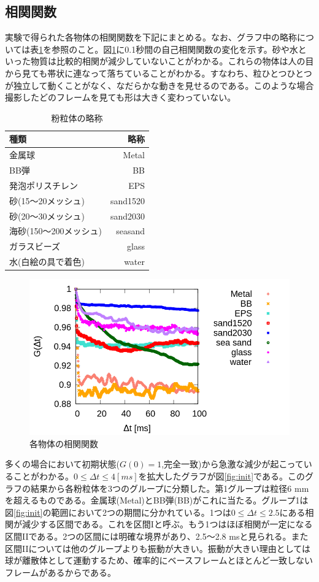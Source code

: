\documentclass[a4paper,10pt,twocolumn,dvipdfmx]{jsarticle}
\newcommand{\Dt}{\Delta t}
\newcommand{\II}{I\hspace{-.1em}I}
\begin{document}
\subsection{相関関数}
実験で得られた各物体の相関関数を下記にまとめる。なお、グラフ中の略称については表\ref{tb:ballname}を参照のこと。図\ref{fig:overall}に0.1秒間の自己相関関数の変化を示す。砂や水といった物質は比較的相関が減少していないことがわかる。これらの物体は人の目から見ても帯状に連なって落ちていることがわかる。すなわち、粒ひとつひとつが独立して動くことがなく、なだらかな動きを見せるのである。このような場合撮影したどのフレームを見ても形は大きく変わっていない。 \par
\begin{table}[H]
	\caption{粉粒体の略称 \label{tb:ballname}}
	\begin{tabular}{lr}
		\toprule
		種類 & 略称 \\
		\midrule
		金属球 & Metal \\
		BB弾 & BB \\
		発泡ポリスチレン & EPS \\
		砂(15〜20メッシュ) & sand1520 \\
		砂(20〜30メッシュ) & sand2030 \\
		海砂(150〜200メッシュ) & seasand \\
		ガラスビーズ & glass \\
		水(白絵の具で着色) & water \\
		\bottomrule
	\end{tabular}
\end{table}
\begin{figure}[H]
	\includegraphics[scale=0.4]{multi.png}
	\caption{各物体の相関関数}
	\label{fig:overall}
\end{figure}
多くの場合において初期状態($G(0)=1$,完全一致)から急激な減少が起こっていることがわかる。$0 \leq \Delta t \leq 4 [ms]$を拡大したグラフが図\ref{fig:init}である。このグラフの結果から各粉粒体を3つのグループに分類した。第1グループは粒径6 mmを超えるものである。金属球(Metal)とBB弾(BB)がこれに当たる。グループ1は図\ref{fig:init}の範囲において2つの期間に分かれている。1つは$0 \leq \Dt \leq 2.5$にある相関が減少する区間である。これを区間Iと呼ぶ。もう1つはほぼ相関が一定になる区間\II である。2つの区間には明確な境界があり、2.5〜2.8 msと見られる。また区間\II については他のグループよりも振動が大きい。振動が大きい理由としては球が離散体として運動するため、確率的にベースフレームとほとんど一致しないフレームがあるからである。 \par
\end{document}

